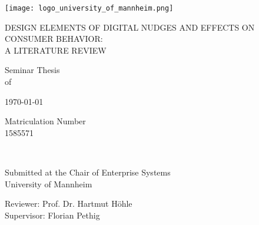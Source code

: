 \begin{titlepage}
	\centering

    \texttt{[image: logo\_university\_of\_mannheim.png]}\par

	\vspace{1.25cm}
	{\scshape\Large\uppercase{Design Elements of Digital Nudges and Effects on Consumer Behavior: \\ A Literature Review}\par}
	
	\vspace{2.5cm}
	{\linespread{1}\normalsize Seminar Thesis\\
	 of  \par}
	
	{\large {}\par}
	
	\vspace{0.5cm}
	{\small \titledate\today \par} %
	
	\vspace{0.3cm}
	{\footnotesize  Matriculation Number\\
	1585571\par}
	
	\vspace{2.5cm}
	\hrulefill\\	
	\vspace{1.0cm}
	{\linespread{1}\normalsize Submitted at the Chair of Enterprise Systems\\
	University of Mannheim\par}
	
	\vspace{0.3cm}
	{\linespread{1}\normalsize  Reviewer: Prof. Dr. Hartmut Höhle\\
	Supervisor: Florian Pethig\par}


\end{titlepage}
\renewcommand{\contentsname}{Table of Contents} %




